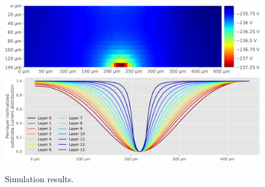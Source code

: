 \begin{figure}[hbtp]
\begin{minipage}{0.5\textwidth}
		\includegraphics[width=\textwidth]{./figures/modelesSimusResul/tripleWell/vSubcManuscritTw-cropped.pdf}
		\includegraphics[width=\textwidth]{./figures/modelesSimusResul/tripleWell/CurrentDistributionNormT140eT10_ExcTw-cropped.pdf}
	\end{minipage}

	\caption{Simulation results.}
	\label{sim_res}
\end{figure}
